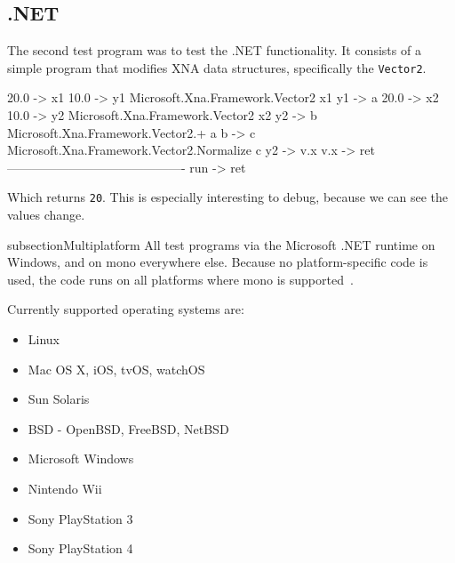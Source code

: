 \subsection{.NET}
The second test program was to test the .NET functionality.
It consists of a simple program that modifies XNA data structures, specifically the \verb|Vector2|.

\begin{MC}
20.0 -> x1
10.0 -> y1
Microsoft.Xna.Framework.Vector2 x1 y1 -> a
20.0 -> x2
10.0 -> y2
Microsoft.Xna.Framework.Vector2 x2 y2 -> b
Microsoft.Xna.Framework.Vector2.+ a b -> c
Microsoft.Xna.Framework.Vector2.Normalize c
y2 -> v.x 
v.x -> ret
-------------------------------------------
run -> ret
\end{MC}

Which returns \verb|20|.
This is especially interesting to debug, because we can see the values change.


subsection{Multiplatform}
All test programs via the Microsoft .NET runtime on Windows, and on mono everywhere else.
Because no platform-specific code is used, the code runs on all platforms where mono is supported~\cite{mono_platforms}.

Currently supported operating systems are:
\begin{itemize}
    \item Linux
    \item Mac OS X, iOS, tvOS, watchOS
    \item Sun Solaris
    \item BSD - OpenBSD, FreeBSD, NetBSD
    \item Microsoft Windows
    \item Nintendo Wii
    \item Sony PlayStation 3
    \item Sony PlayStation 4
\end{itemize}

